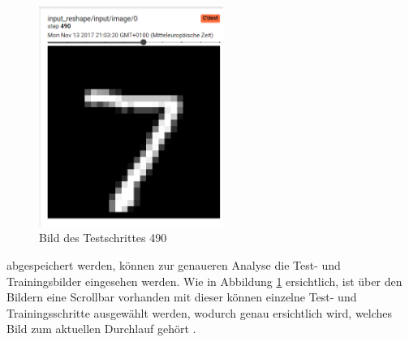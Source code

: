 \begin{figure}[htb!]
	\centering
     \includegraphics[width=6cm]{images/Kapitel_3/images.png}
	\vspace{10pt} 
	\caption{Bild des Testschrittes 490}
	\label{fig:TensorBoard_image}
\end{figure}

abgespeichert werden, können zur genaueren Analyse die Test- und Trainingsbilder eingesehen werden. Wie in Abbildung \ref{fig:TensorBoard_image} ersichtlich, ist über den Bildern eine Scrollbar vorhanden mit dieser können einzelne Test- und Trainingsschritte ausgewählt werden, wodurch genau ersichtlich wird, welches Bild zum aktuellen Durchlauf gehört \cite{tensorboard.2017}.
\vspace{50pt}
\newpage


